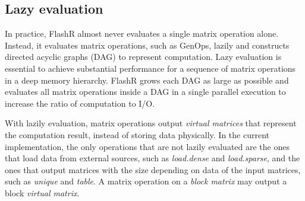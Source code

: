 


\subsection{Lazy evaluation}\label{sec:lazyeval}

In practice, FlashR almost never evaluates a single matrix operation alone.
Instead, it evaluates matrix operations, such as GenOps,
lazily and constructs directed acyclic graphs (DAG) to represent computation.
Lazy evaluation is essential to achieve substantial performance for a sequence
of matrix operations in a deep memory hierarchy. FlashR grows each DAG as large
as possible and evaluates all matrix operations inside a DAG
in a single parallel execution to increase the ratio of computation to I/O.

With lazily evaluation, matrix operations
output \textit{virtual matrices} that represent the computation result,
instead of storing data physically. In the current implementation,
the only operations that are not lazily evaluated are the ones that
load data from external sources, such as \textit{load.dense} and
\textit{load.sparse}, and the ones that output matrices
with the size depending on data of the input matrices, such as \textit{unique}
and \textit{table}. A matrix operation on a \textit{block matrix} may output
a block \textit{virtual matrix}.


